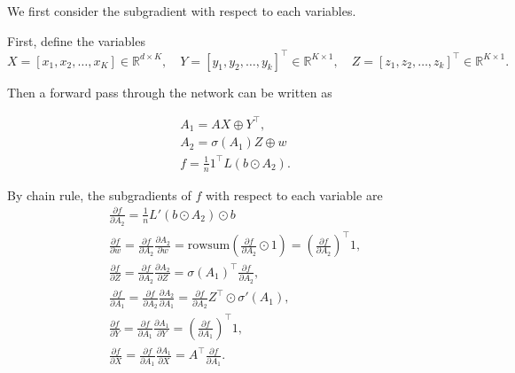 \documentclass{article}
\numberwithin{equation}{section}
\numberwithin{figure}{section}
\begin{document}
We first consider the subgradient with respect to each variables. 

First, define the variables
\begin{equation}
X = [x_1, x_2, \hdots, x_K] \in\mathbb{R}^{d\times K}, \quad Y = [y_1, y_2, \hdots, y_k]^\top \in\mathbb{R}^{K\times 1}, \quad Z = [z_1, z_2, \hdots, z_k]^\top \in\mathbb{R}^{K\times 1}.
\end{equation}

Then a forward pass through the network can be written as

\begin{equation}
\begin{aligned}
&A_1 = AX\oplus Y^\top, \\
&A_2 = \sigma(A_1)Z \oplus w \\
&f = \frac{1}{n}1^\top L(b\odot A_2).
\end{aligned}
\end{equation}

By chain rule, the subgradients of $f$ with respect to each variable are
\begin{equation}
\begin{aligned}
&\frac{\partial f}{\partial A_2} = \frac{1}{n}L'(b\odot A_2)\odot b \\
&\frac{\partial f}{\partial w} = \frac{\partial f}{\partial A_2}\frac{\partial A_2}{\partial w} = \text{rowsum}(\frac{\partial f}{\partial A_2}\odot 1) = \left(\frac{\partial f}{\partial A_2}\right)^\top 1, \\
&\frac{\partial f}{\partial Z} = \frac{\partial f}{\partial A_2}\frac{\partial A_2}{\partial Z} = \sigma(A_1)^\top \frac{\partial f}{\partial A_2}, \\
&\frac{\partial f}{\partial A_1} = \frac{\partial f}{\partial A_2}\frac{\partial A_2}{\partial A_1} = \frac{\partial f}{\partial A_2}Z^\top \odot \sigma'(A_1), \\
&\frac{\partial f}{\partial Y} = \frac{\partial f}{\partial A_1}\frac{\partial A_1}{\partial Y} = \left(\frac{\partial f}{\partial A_1}\right)^\top 1, \\
&\frac{\partial f}{\partial X} = \frac{\partial f}{\partial A_1}\frac{\partial A_1}{\partial X} = A^\top \frac{\partial f}{\partial A_1}.
\end{aligned}
\end{equation}
\end{document}
